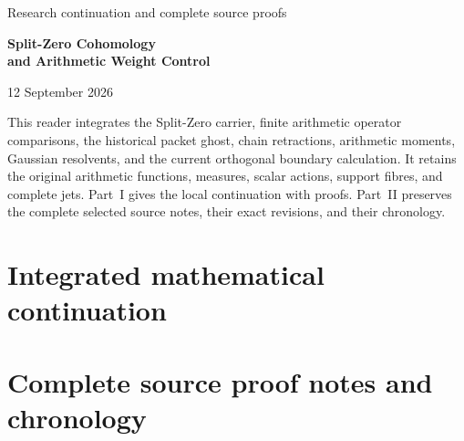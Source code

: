 \documentclass[11pt,a4paper]{article}
\theoremstyle{definition}
\theoremstyle{remark}
\begin{document}
\begin{titlepage}
\centering
\vspace*{25mm}
{\Large Research continuation and complete source proofs\par}
\vspace{12mm}
{\Huge\bfseries Split-Zero Cohomology\\[5mm]and Arithmetic Weight Control\par}
\vspace{15mm}
{\Large 12 September 2026\par}
\vfill
\begin{minipage}{0.87\textwidth}
This reader integrates the Split-Zero carrier, finite arithmetic operator
comparisons, the historical packet ghost, chain retractions, arithmetic
moments, Gaussian resolvents, and the current orthogonal boundary calculation.
It retains the original arithmetic
functions, measures, scalar actions, support fibres, and complete jets.
Part~I gives the local continuation with proofs. Part~II preserves the
complete selected source notes, their exact revisions, and their chronology.
\end{minipage}
\vspace{22mm}
\end{titlepage}
\tableofcontents
\clearpage
\part{Integrated mathematical continuation}
















\clearpage
\part{Complete source proof notes and chronology}
\appendix
\sloppy

\end{document}
